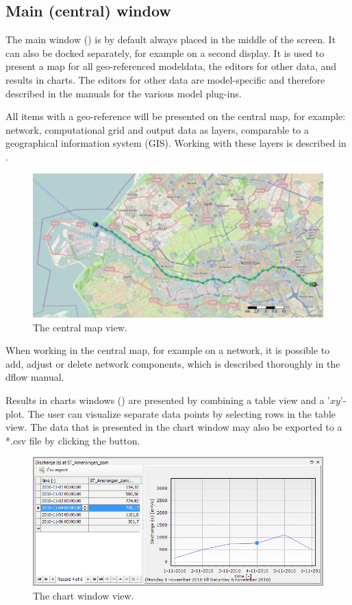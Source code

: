 \subsection{Main (central) window}
\label{subsec:Main}
The main window () is by default always placed in the middle of the screen. It can also be docked separately, for example on a second display. It is used to present a map for all geo-referenced modeldata, the editors for other data, and results in charts. The editors for other data are model-specific and therefore described in the manuals for the various model plug-ins.

All items with a geo-reference will be presented on the central map, for example: network, computational grid and output data as layers, comparable to a geographical information system (GIS). Working with these layers is described in .
%
\begin{figure} [H]
	\centering
		\includegraphics[width=\textwidth]{Figures/Chapter_overview/example_map.png}
	\caption{The central map view.}
	\label{fig:fig2.3}
\end{figure}
When working in the central map, for example on a network, it is possible to add, adjust or delete network components, which is described thoroughly in the dflow manual.

Results in charts windows () are presented by combining a table view and a '$xy$'-plot. The user can visualize separate data points by selecting rows in the table view. The data that is presented in the chart window may also be exported to a *.csv file by clicking the  button.
%
\begin{figure} [H]
	\centering
		\includegraphics[width=\textwidth]{Figures/Chapter_overview/example_chart_window.png}
	\caption{The chart window view.}
	\label{fig:chartwindow}
\end{figure}

